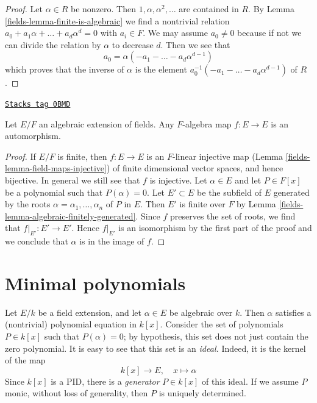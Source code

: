 \begin{proof}

Let $\alpha \in R$ be nonzero. Then $1, \alpha, \alpha^2, \ldots$
are contained in $R$. By Lemma \ref{fields-lemma-finite-is-algebraic}
we find a nontrivial relation
$a_0 + a_1 \alpha + \ldots + a_d \alpha^d = 0$ with $a_i \in F$.
We may assume $a_0 \not = 0$ because if not we can divide the relation
by $\alpha$ to decrease $d$. Then we see that
$$
a_0 = \alpha (- a_1  - \ldots - a_d \alpha^{d - 1})
$$
which proves that the inverse of $\alpha$ is the element
$a_0^{-1} (- a_1  - \ldots - a_d \alpha^{d - 1})$
of $R$.
\end{proof}

\begin{lemma}
\label{fields-lemma-algebraic-extension-self-map}
\href{https://stacks.math.columbia.edu/tag/0BMD}{\texttt{Stacks tag 0BMD}}

Let $E/F$ an algebraic extension of fields. Any $F$-algebra map
$f : E \to E$ is an automorphism.
\end{lemma}

\begin{proof}

If $E/F$ is finite, then $f : E \to E$ is an $F$-linear
injective map (Lemma \ref{fields-lemma-field-maps-injective})
of finite dimensional vector spaces, and hence bijective.
In general we still see that $f$ is injective.
Let $\alpha \in E$ and let $P \in F[x]$ be a
polynomial such that $P(\alpha) = 0$.
Let $E' \subset E$ be the subfield of $E$ generated
by the roots $\alpha = \alpha_1, \ldots, \alpha_n$ of $P$ in $E$.
Then $E'$ is finite over $F$ by Lemma \ref{fields-lemma-algebraic-finitely-generated}.
Since $f$ preserves the set of roots, we find that
$f|_{E'} : E' \to E'$. Hence $f|_{E'}$ is an isomorphism
by the first part of the proof and we conclude that $\alpha$
is in the image of $f$.
\end{proof}

\section{Minimal polynomials}
\label{fields-section-minimal-polynomials}
Let $E/k$ be a field extension, and let $\alpha \in E$ be algebraic over $k$.
Then $\alpha$ satisfies a (nontrivial) polynomial equation in $k[x]$.
Consider the set of polynomials $P \in k[x]$ such that $P(\alpha) = 0$; by
hypothesis, this set does not just contain the zero polynomial.
It is easy to see that this set is an {\it ideal.} Indeed, it is the kernel
of the map
$$
k[x] \to E, \quad x \mapsto \alpha
$$
Since $k[x]$ is a PID, there is a {\it generator} $P \in k[x]$ of this
ideal. If we assume $P$ monic, without loss of generality, then $P$ is
uniquely determined.

